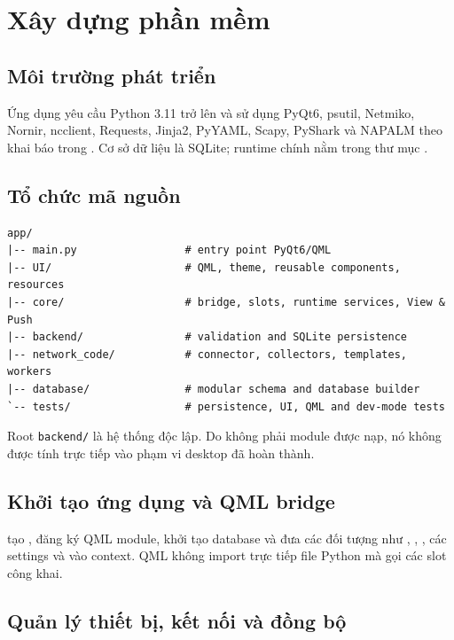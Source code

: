 \chapter{Xây dựng phần mềm}
\label{chap:xay-dung-phan-mem}

\section{Môi trường phát triển}

Ứng dụng yêu cầu Python 3.11 trở lên và sử dụng PyQt6, psutil, Netmiko, Nornir, ncclient, Requests, Jinja2, PyYAML, Scapy, PyShark và NAPALM theo khai báo trong . Cơ sở dữ liệu là SQLite; runtime chính nằm trong thư mục .

\section{Tổ chức mã nguồn}

\begin{lstlisting}[caption={Cây thư mục runtime rút gọn}]
app/
|-- main.py                 # entry point PyQt6/QML
|-- UI/                     # QML, theme, reusable components, resources
|-- core/                   # bridge, slots, runtime services, View & Push
|-- backend/                # validation and SQLite persistence
|-- network_code/           # connector, collectors, templates, workers
|-- database/               # modular schema and database builder
`-- tests/                  # persistence, UI, QML and dev-mode tests
\end{lstlisting}

Root \texttt{backend/} là hệ thống độc lập. Do không phải module được  nạp, nó không được tính trực tiếp vào phạm vi desktop đã hoàn thành.

\section{Khởi tạo ứng dụng và QML bridge}

 tạo , đăng ký QML module, khởi tạo database và đưa các đối tượng như , , , các settings và  vào context. QML không import trực tiếp file Python mà gọi các slot công khai.

\section{Quản lý thiết bị, kết nối và đồng bộ}

